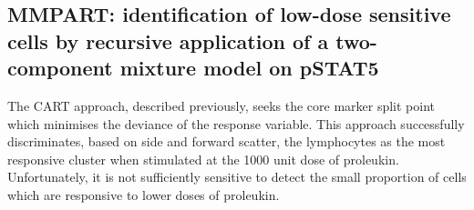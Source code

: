 

%



\subsection{MMPART: identification of low-dose sensitive cells by recursive application of a two-component mixture model on pSTAT5}

The CART approach, described previously, seeks the core marker split point which minimises the deviance of the response variable.
This approach successfully discriminates, based on side and forward scatter, the lymphocytes as the most responsive cluster
when stimulated at the 1000 unit dose of proleukin.
Unfortunately, it is not sufficiently sensitive to detect the small proportion of cells which are responsive to lower doses of proleukin.

